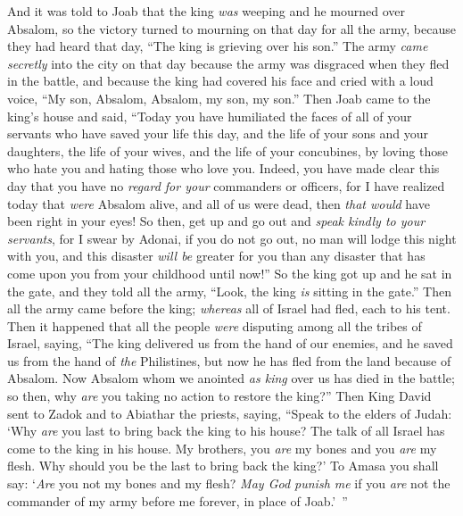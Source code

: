 \begin{biblechapter} %
 And it was told to Joab that the king \textit{was} weeping and he mourned over Absalom,
\verse so the victory turned to mourning on that day for all the army, because they had heard that day, “The king is grieving over his son.”
\verse The army \textit{came secretly} into the city on that day because the army was disgraced when they fled in the battle,
\verse and because the king had covered his face and cried with a loud voice, “My son, Absalom, Absalom, my son, my son.”
\verse Then Joab came to the king’s house and said, “Today you have humiliated the faces of all of your servants who have saved your life this day, and the life of your sons and your daughters, the life of your wives, and the life of your concubines,
\verse by loving those who hate you and hating those who love you. Indeed, you have made clear this day that you have no \textit{regard for your} commanders or officers, for I have realized today that \textit{were} Absalom alive, and all of us were dead, then \textit{that would} have been right in your eyes!
\verse So then, get up and go out and \textit{speak kindly to your servants}, for I swear by Adonai, if you do not go out, no man will lodge this night with you, and this disaster \textit{will be} greater for you than any disaster that has come upon you from your childhood until now!”
\verse So the king got up and he sat in the gate, and they told all the army, “Look, the king \textit{is} sitting in the gate.” Then all the army came before the king; \textit{whereas} all of Israel had fled, each to his tent.
 Then it happened that all the people \textit{were} disputing among all the tribes of Israel, saying, “The king delivered us from the hand of our enemies, and he saved us from the hand of \textit{the} Philistines, but now he has fled from the land because of Absalom.
\verse Now Absalom whom we anointed \textit{as king} over us has died in the battle; so then, why \textit{are} you taking no action to restore the king?”
\verse Then King David sent to Zadok and to Abiathar the priests, saying, “Speak to the elders of Judah: ‘Why \textit{are} you last to bring back the king to his house? The talk of all Israel has come to the king in his house.
\verse My brothers, you \textit{are} my bones and you \textit{are} my flesh. Why should you be the last to bring back the king?’
\verse To Amasa you shall say: ‘\textit{Are} you not my bones and my flesh? \textit{May God punish me} if you \textit{are} not the commander of my army before me forever, in place of Joab.’ ”

\end{biblechapter}
